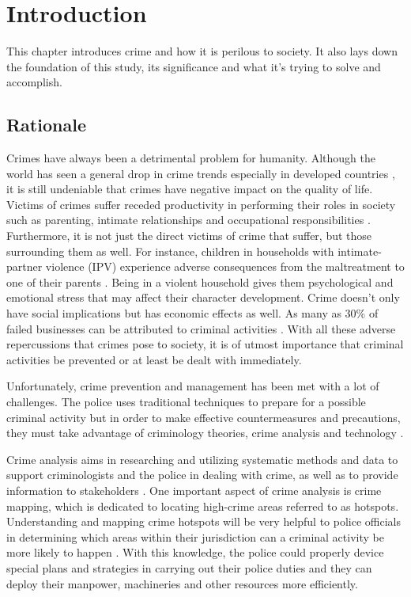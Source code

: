 \chapter{Introduction}
    This chapter introduces crime and how it is perilous to society. It also lays down the foundation of this study, its significance and what it's trying to solve and accomplish.
\section{Rationale}

    Crimes have always been a detrimental problem for humanity. Although the world has seen a general drop in crime trends especially in developed countries \citep{dijk2007criminal}, it is still undeniable that crimes have negative impact on the quality of life. Victims of crimes suffer receded productivity in performing their roles in society such as parenting, intimate relationships and occupational responsibilities \citep{hanson2010impact}. Furthermore, it is not just the direct victims of crime that suffer, but those surrounding them as well. For instance, children in households with intimate-partner violence (IPV) experience adverse consequences from the maltreatment to one of their parents \citep{casanueva2008quality}. Being in a violent household gives them psychological and emotional stress that may affect their character development. Crime doesn’t only have social implications but has economic effects as well. As many as 30\% of failed businesses can be attributed to criminal activities \citep{bressler2009impact}. With all these adverse repercussions that crimes pose to society, it is of utmost importance that criminal activities be prevented or at least be dealt with immediately.

    Unfortunately, crime prevention and management has been met with a lot of challenges. The police uses traditional techniques to prepare for a possible criminal activity but in order to make effective countermeasures and precautions, they must take advantage of criminology theories, crime analysis and technology \citep{polat2007spatio}.

    Crime analysis aims in researching and utilizing systematic methods and data to support criminologists and the police in dealing with crime, as well as to provide information to stakeholders \citep{santos2012crime}. One important aspect of crime analysis is crime mapping, which is dedicated to locating high-crime areas referred to as hotspots. Understanding and mapping crime hotspots will be very helpful to police officials in determining which areas within their jurisdiction can a criminal activity be more likely to happen \citep{eck2005mapping}. With this knowledge, the police could properly device special plans and strategies in carrying out their police duties and they can deploy their manpower, machineries and other resources more efficiently.

